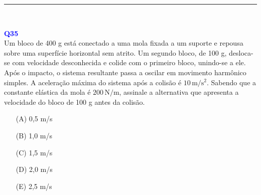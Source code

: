 \documentclass[a4paper,12pt]{article}
\begin{document}
\noindent\rule{\linewidth}{0.6pt}\\

\begin{flushleft}
\textbf{\textcolor{blue}{\Large Q35}}\\

Um bloco de 400 g está conectado a uma mola fixada a um suporte e repousa sobre uma superfície horizontal sem atrito. 
Um segundo bloco, de 100 g, desloca-se com velocidade desconhecida e colide com o primeiro bloco, unindo-se a ele. Após 
o impacto, o sistema resultante passa a oscilar em movimento harmônico simples. A aceleração máxima do sistema após a colisão 
é $10\,\mathrm{m/s^2}$. Sabendo que a constante elástica da mola é $200\,\mathrm{N/m}$, assinale a alternativa que apresenta a 
velocidade do bloco de 100 g antes da colisão.


\begin{itemize}
\item[(A)] 0,5 m/s
\item[(B)] 1,0 m/s
\item[(C)] 1,5 m/s
\item[(D)] 2,0 m/s
\item[(E)] 2,5 m/s
\end{itemize}

\vspace{0.5cm}

\begin{center}
\end{center}
\end{flushleft}
\end{document}

